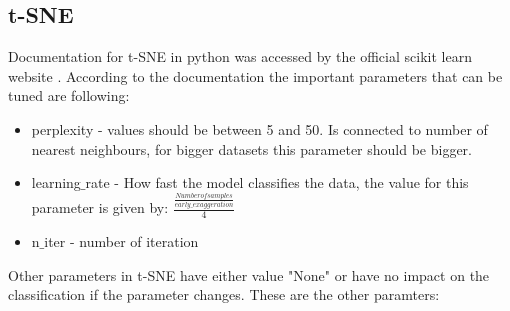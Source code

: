 \documentclass[12pt]{report}
\begin{document}
	\subsection{t-SNE}
	Documentation for t-SNE in python was accessed by the official scikit learn website \cite{Doct-SNE}. According to the documentation the important parameters that can be tuned are following:
	\begin{itemize}
		\item perplexity - values should be between 5 and 50. Is connected to number of nearest neighbours, for bigger datasets this parameter should be bigger.
		\item learning$\_$rate - How fast the model classifies the data, the value for this parameter is given by: $\frac{\frac{Number of samples}{early\_exaggeration}}{4}$
		\item n$\_$iter - number of iteration
	\end{itemize}
	Other parameters in t-SNE have either value "None" or have no impact on the classification if the parameter changes. These are the other paramters:
\end{document}
